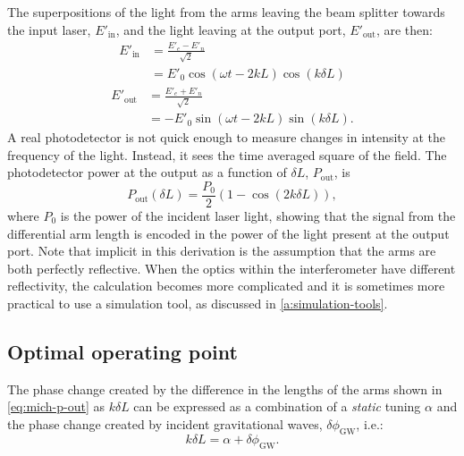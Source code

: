 The superpositions of the light from the arms leaving the beam splitter towards the input laser, $E'_{\text{in}}$, and the light leaving at the output port, $E'_{\text{out}}$, are then:
\begin{equation}
  \begin{split}
    E'_{\text{in}} &= \frac{E'_{e} - E'_{n}}{\sqrt{2}} \\
                      &= E'_0 \cos \left( \omega t - 2kL \right) \cos \left( k \delta L \right)
  \end{split}
\end{equation}
\begin{equation}
  \begin{split}
    E'_{\text{out}} &= \frac{E'_{e} + E'_{n}}{\sqrt{2}} \\
                       &= -E'_0 \sin \left( \omega t - 2kL \right) \sin \left( k \delta L \right).
  \end{split}
\end{equation}
A real photodetector is not quick enough to measure changes in intensity at the frequency of the light. Instead, it sees the time averaged square of the field. The photodetector power at the output as a function of $\delta L$, $P_{\text{out}}$, is
\begin{equation}
  \label{eq:mich-p-out}
  P_{\text{out}} \left( \delta L \right) = \frac{P_0}{2} \left( 1 - \cos \left( 2k \delta L \right) \right),
\end{equation}
where $P_0$ is the power of the incident laser light, showing that the signal from the differential arm length is encoded in the power of the light present at the output port. Note that implicit in this derivation is the assumption that the arms are both perfectly reflective. When the optics within the interferometer have different reflectivity, the calculation becomes more complicated and it is sometimes more practical to use a simulation tool, as discussed in \cref{a:simulation-tools}.

\subsection{\label{sec:operating-point}Optimal operating point}
The phase change created by the difference in the lengths of the arms shown in \cref{eq:mich-p-out} as $k \delta L$ can be expressed as a combination of a \emph{static} tuning $\alpha$ and the phase change created by incident gravitational waves, $\delta \phi_{\text{GW}}$, i.e.:
\begin{equation}
  k \delta L = \alpha + \delta \phi_{\text{GW}}.
\end{equation}

